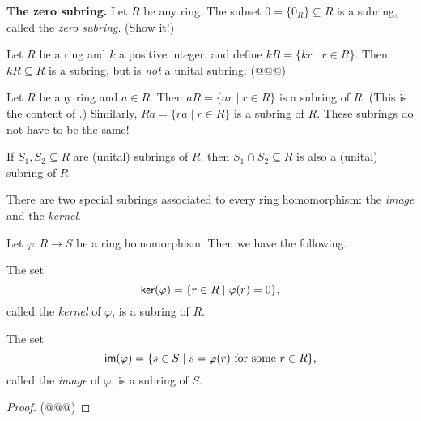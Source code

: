 \begin{examples}
\item \textbf{The zero subring.} Let \(R\) be any ring.
The subset \(0 = \{0_R\} \subseteq R\) is a subring, called the \emph{zero subring}.
(Show it!)

\item Let \(R\) be a ring and \(k\) a positive integer, and define \(kR = \{ kr \mid r \in R \}\).
Then \(kR \subseteq R\) is a subring, but is \emph{not} a unital subring.
(@@@)

\item Let \(R\) be any ring and \(a \in R\).
Then \(aR = \{ ar \mid r \in R \}\) is a subring of \(R\).
(This is the content of .)
Similarly, \(Ra = \{ ra \mid r \in R \}\) is a subring of \(R\).
These subrings do not have to be the same!

\item If \(S_1, S_2 \subseteq R\) are (unital) subrings of \(R\), then \(S_1 \cap S_2 \subseteq R\) is also a (unital) subring of \(R\).
\end{examples}

There are two special subrings associated to every ring homomorphism: the \emph{image} and the \emph{kernel}.

\begin{prop} \label{dfn:im-ker}
Let \(\varphi : R \rightarrow S\) be a ring homomorphism.
Then we have the following.
\begin{proplist}
\item The set \[  \mathsf{ker}(\varphi)  = \{ r \in R \mid \varphi(r) = 0 \}, \] called the \emph{kernel} of \(\varphi\), is a subring of \(R\).
\item The set \[  \mathsf{im}(\varphi)  = \{ s \in S \mid s = \varphi(r)\ \mathrm{for\ some}\ r \in R \}, \] called the \emph{image} of \(\varphi\), is a subring of \(S\).
\end{proplist}
\end{prop}

\begin{proof}
(@@@)
\end{proof}

